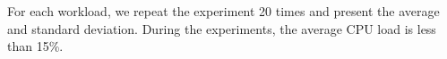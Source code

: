 For each workload, we repeat the experiment 20 times and present the average and standard deviation. During the experiments, the average CPU load is less than 15\%. %

